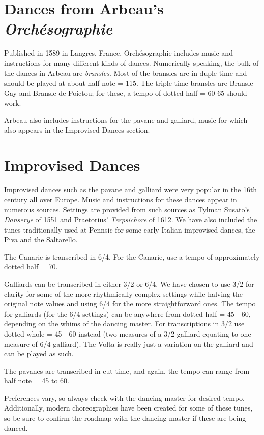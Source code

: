 \documentclass[11pt]{book}
\begin{document}


\chapter{Dances from Arbeau's {\em Orchésographie}}

Published in 1589 in Langres, France, Orchésographie includes music and
instructions for many different kinds of dances. Numerically speaking, the bulk
of the dances in Arbeau are {\em bransles}. Most of the bransles are in duple
time and should be played at about half note = 115.  The triple time bransles
are Bransle Gay and Bransle de Poictou; for these, a tempo of dotted half =
60-65 should work.

Arbeau also includes instructions for the pavane and galliard, music for which
also appears in the Improvised Dances section.



\chapter{Improvised Dances}

Improvised dances such as the pavane and galliard were very popular in the 16th
century all over Europe. Music and instructions for these dances appear in
numerous sources. Settings are provided from such sources as Tylman Susato's
{\em Danserye} of 1551 and Praetorius' {\em Terpsichore} of 1612. We have also
included the tunes traditionally used at Pennsic for some early Italian
improvised dances, the Piva and the Saltarello.

The Canarie is transcribed in 6/4. For the Canarie, use a tempo of
approximately dotted half = 70.

Galliards can be transcribed in either 3/2 or 6/4. We have chosen to use 3/2
for clarity for some of the more rhythmically complex settings while halving
the original note values and using 6/4 for the more straightforward ones. The
tempo for galliards (for the 6/4 settings) can be anywhere from dotted half =
45 - 60, depending on the whims of the dancing master. For transcriptions in
3/2 use dotted whole = 45 - 60 instead (two measures of a 3/2 galliard equating
to one measure of 6/4 galliard). The Volta is really just a variation on the
galliard and can be played as such.

The pavanes are transcribed in cut time, and again, the tempo can range from
half note = 45 to 60.

Preferences vary, so always check with the dancing master for desired tempo.
Additionally, modern choreographies have been created for some of these tunes,
so be sure to confirm the roadmap with the dancing master if these are being
danced.
\end{document}

